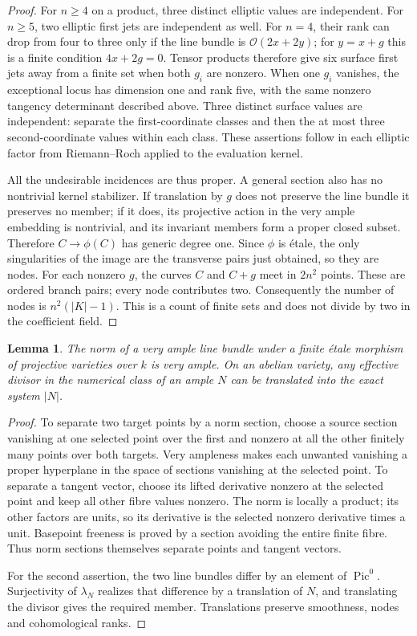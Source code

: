 \documentclass[11pt]{article}
\newtheorem{lemma}[theorem]{Lemma}
\theoremstyle{definition}\newtheorem{definition}[theorem]{Definition}
\theoremstyle{remark}\newtheorem{remark}[theorem]{Remark}
\newcommand{\OO}{\mathcal O}
\newcommand{\Pic}{\operatorname{Pic}}
\begin{document}
\begin{proof}
For $n\ge4$ on a product, three distinct elliptic values are independent. For $n\ge5$, two elliptic first jets are independent as well. For $n=4$, their rank can drop from four to three only if the line bundle is $\OO(2x+2y)$; for $y=x+g$ this is a finite condition $4x+2g=0$. Tensor products therefore give six surface first jets away from a finite set when both $g_i$ are nonzero. When one $g_i$ vanishes, the exceptional locus has dimension one and rank five, with the same nonzero tangency determinant described above. Three distinct surface values are independent: separate the first-coordinate classes and then the at most three second-coordinate values within each class. These assertions follow in each elliptic factor from Riemann--Roch applied to the evaluation kernel.

All the undesirable incidences are thus proper. A general section also has no nontrivial kernel stabilizer. If translation by $g$ does not preserve the line bundle it preserves no member; if it does, its projective action in the very ample embedding is nontrivial, and its invariant members form a proper closed subset. Therefore $C\to\phi(C)$ has generic degree one. Since $\phi$ is \'etale, the only singularities of the image are the transverse pairs just obtained, so they are nodes. For each nonzero $g$, the curves $C$ and $C+g$ meet in $2n^2$ points. These are ordered branch pairs; every node contributes two. Consequently the number of nodes is $n^2(|K|-1)$. This is a count of finite sets and does not divide by two in the coefficient field.
\end{proof}

\begin{lemma}\label{lem:exact-system}
The norm of a very ample line bundle under a finite \'etale morphism of projective varieties over $k$ is very ample. On an abelian variety, any effective divisor in the numerical class of an ample $N$ can be translated into the exact system $|N|$.
\end{lemma}
\begin{proof}
To separate two target points by a norm section, choose a source section vanishing at one selected point over the first and nonzero at all the other finitely many points over both targets. Very ampleness makes each unwanted vanishing a proper hyperplane in the space of sections vanishing at the selected point. To separate a tangent vector, choose its lifted derivative nonzero at the selected point and keep all other fibre values nonzero. The norm is locally a product; its other factors are units, so its derivative is the selected nonzero derivative times a unit. Basepoint freeness is proved by a section avoiding the entire finite fibre. Thus norm sections themselves separate points and tangent vectors.

For the second assertion, the two line bundles differ by an element of $\Pic^0$. Surjectivity of $\lambda_N$ realizes that difference by a translation of $N$, and translating the divisor gives the required member. Translations preserve smoothness, nodes and cohomological ranks.
\end{proof}
\end{document}
